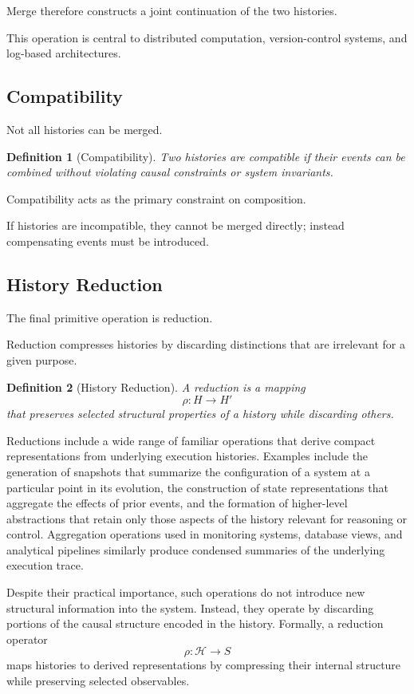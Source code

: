 \documentclass[12pt]{article}
\newtheorem{definition}{Definition}
\begin{document}
Merge therefore constructs a joint continuation of the
two histories.

This operation is central to distributed computation,
version-control systems, and log-based architectures.

\subsection{Compatibility}

Not all histories can be merged.

\begin{definition}[Compatibility]
Two histories are compatible if their events can be combined
without violating causal constraints or system invariants.
\end{definition}

Compatibility acts as the primary constraint on composition.

If histories are incompatible, they cannot be merged directly;
instead compensating events must be introduced.

\subsection{History Reduction}

The final primitive operation is reduction.

Reduction compresses histories by discarding distinctions
that are irrelevant for a given purpose.

\begin{definition}[History Reduction]
A reduction is a mapping
\[
\rho : H \rightarrow H'
\]
that preserves selected structural properties of a history
while discarding others.
\end{definition}

Reductions include a wide range of familiar operations that
derive compact representations from underlying execution
histories. Examples include the generation of snapshots that
summarize the configuration of a system at a particular point
in its evolution, the construction of state representations
that aggregate the effects of prior events, and the formation
of higher-level abstractions that retain only those aspects
of the history relevant for reasoning or control. Aggregation
operations used in monitoring systems, database views, and
analytical pipelines similarly produce condensed summaries of
the underlying execution trace.

Despite their practical importance, such operations do not
introduce new structural information into the system. Instead,
they operate by discarding portions of the causal structure
encoded in the history. Formally, a reduction operator
\[
\rho : \mathcal{H} \rightarrow S
\]
maps histories to derived representations by compressing
their internal structure while preserving selected
observables.
\end{document}
